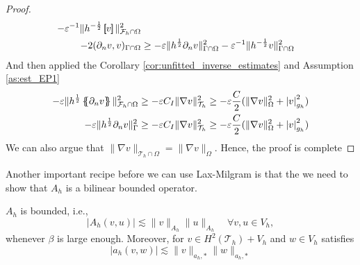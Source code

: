 \begin{proof}
\[\begin{split}
  - \varepsilon ^{-1} \| h^{-\frac{1}{2}} \left[\!\!\left[  v  \right]\!\!\right]   \|_{\mathcal{F} _{h} \cap \Omega   }^{ 2 } \\
- 2 ( \partial _{n} v,v)_{\Gamma \cap \Omega }   &\ge- \varepsilon \| h^{\frac{1}{2}} \partial _{n} v \|_{ \Gamma \cap \Omega  }^{2  }
-  \varepsilon ^{-1} \| h^{-\frac{1}{2}} v \|_{  \Gamma \cap  \Omega }^{ 2 }
     \end{split}
 \]
 And then applied the Corollary \ref{cor:unfitted_inverse_estimates} and Assumption \ref{as:est_EP1} \[
     \begin{split}
         - \varepsilon \| h^{\frac{1}{2}}  \left\{\!\!\left\{  \partial _{n} v\right\}\!\!\right\}      \|_{ \mathcal{F} _{h} \cap \Omega  }^{2  } \ge   - \varepsilon C_{I }  \|\nabla v  \|_{ \mathcal{T}_{h}  }^{2  } \ge -\varepsilon \frac{C}{2} ( \|\nabla v  \|_{ \Omega}^{2} +  \left\lvert 
         v \right\rvert  _{g_{h}  }^{  2}  )  \\
    - \varepsilon \| h^{\frac{1}{2}}    \partial _{n} v      \|_{ \Gamma   }^{2  } \ge   - \varepsilon C_{I }  \|\nabla v  \|_{ \mathcal{T}_{h}  }^{2  } \ge -\varepsilon \frac{C}{2} ( \|\nabla v  \|_{ \Omega}^{2} +  \left\lvert  v  \right\rvert  _{g_{h}  }^{ 2 }  ) \\
     \end{split}
 \]
 We can also argue that $\| \nabla v \|_{ \mathcal{T} _{h}\cap \Omega  }^{  }  = \| \nabla v \|_{ \Omega  }^{  } $. Hence, the proof is complete



\end{proof}

Another important recipe before we can use Lax-Milgram is that the we need to show that $A_{h} $ is a bilinear bounded operator.

\begin{lemma}
    $A_{h}$ is bounded, i.e.,
    $$ \left\lvert A_{h}( v,u) \right\rvert \lesssim \| v \|_{A_{h}  }^{  }     \| u \|_{A_{h}  }^{  } \quad  \forall v,u \in V _{h}, $$
    whenever $\beta $ is large enough. Moreover, for $v \in  H^{2}( \mathcal{T}_{h} ) + V_{h} $
    and $w \in V_{h}$ satisfies \[
    \left\lvert a_{h}( v,w) \right\rvert  \lesssim \| v \|_{ a_{h},* }^{  }  \| w \|_{ a_{h},* }^{  }
    \]
\end{lemma}

